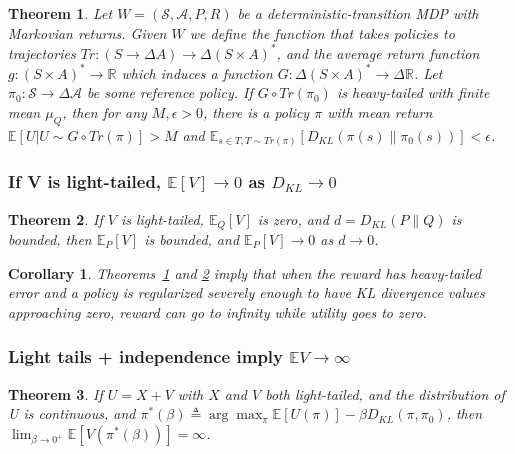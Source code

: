 \documentclass{article}
\newtheorem{theorem}{Theorem}
\begin{document}
\begin{theorem}
\label{thm2}
Let \(W = (\mathcal S, \mathcal A, P, R)\) be
a deterministic-transition MDP with Markovian returns. Given \(W\) we
define the function that takes policies to trajectories
\(Tr: (S \to \Delta A) \to \Delta(S \times A)^*\), and the average
return function \(g: (S \times A)^* \to \mathbb R\) which induces a
function \(G: \Delta(S \times A)^* \to \Delta \mathbb R\). Let
\(\pi_0: \mathcal S \to \Delta \mathcal A\) be some reference policy. If
\(G \circ Tr(\pi_0)\) is heavy-tailed with finite mean \(\mu_Q\), then
for any \(M, \epsilon > 0\), there is a policy \(\pi\) with mean return
\(\mathbb E[U | U \sim G \circ Tr(\pi)] > M\) and
\(\mathbb E_{s \in T, T\sim Tr(\pi)}[D_{KL}(\pi(s) \| \pi_0(s))] < \epsilon\).
\end{theorem}

\subsubsection{If V is light-tailed, \texorpdfstring{$\mathbb E[V] \to 0$}{} as \texorpdfstring{$D_{KL} \to 0$}{}}

\begin{theorem}
\label{thm3} If \(V\) is light-tailed, \(\mathbb E_Q[V]\)
is zero, and \(d = D_{KL}(P \| Q)\) is bounded, then
\(\mathbb E_P[V]\) is bounded, and \(\mathbb E_P[V] \to 0\) as
\(d \to 0\).
\end{theorem}

\newtheorem{corr}{Corollary}
\begin{corr}
\label{cor:heavy-tailed}
    Theorems~\ref{thm2} and \ref{thm3} imply that when the reward has heavy-tailed error and a policy is regularized severely enough to have KL divergence values approaching zero, reward can go to infinity while utility goes to zero.
\end{corr}

\hypertarget{light-tails-independence-imply-mathbb-ev-to-infty}{%
\subsubsection{\texorpdfstring{Light tails + independence imply
\(\mathbb EV \to \infty\)}{Light tails + independence imply \textbackslash mathbb EV \textbackslash to \textbackslash infty}}\label{light-tails-independence-imply-mathbb-ev-to-infty}}
 
\begin{theorem}
\label{thm4} If \(U=X+V\) with \(X\) and \(V\) both
light-tailed, and the distribution of U is continuous, and
\(\pi^*(\beta) \triangleq \arg \max_\pi \mathbb E[U(\pi)] - \beta D_{KL}(\pi, \pi_0)\),
then \(\lim_{\beta \to 0^+} \mathbb E[V(\pi^*(\beta))] = \infty\).
\end{theorem}
\end{document}
